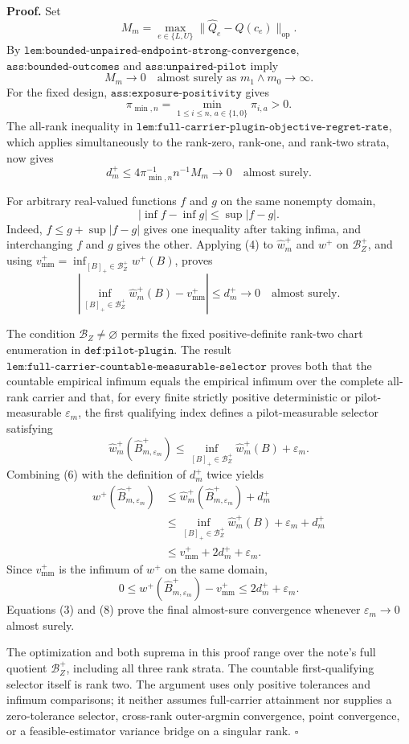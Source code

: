 \textbf{Proof.}
Set
\[
 M_m=\max_{e\in\{L,U\}}
 \lVert\widehat Q_e-Q(c_e)\rVert_{\mathrm{op}}.
\]
By \(\texttt{lem:bounded-unpaired-endpoint-strong-convergence}\), \(\texttt{ass:bounded-outcomes}\) and \(\texttt{ass:unpaired-pilot}\) imply
\[
 M_m\longrightarrow0
 \quad\text{almost surely as }m_1\wedge m_0\to\infty.
\tag{1}
\]
For the fixed design, \(\texttt{ass:exposure-positivity}\) gives
\[
 \pi_{\min,n}=\min_{1\le i\le n,\,a\in\{1,0\}}\pi_{i,a}>0.
\tag{2}
\]
The all-rank inequality in \(\texttt{lem:full-carrier-plugin-objective-regret-rate}\), which applies simultaneously to the rank-zero, rank-one, and rank-two strata, now gives
\[
 d_m^+
 \le4\pi_{\min,n}^{-1}n^{-1}M_m
 \longrightarrow0
 \quad\text{almost surely}.
\tag{3}
\]

For arbitrary real-valued functions \(f\) and \(g\) on the same nonempty domain,
\[
 \left|\inf f-\inf g\right|\le\sup|f-g|.
\tag{4}
\]
Indeed, \(f\le g+\sup|f-g|\) gives one inequality after taking infima, and interchanging \(f\) and \(g\) gives the other.  Applying (4) to \(\widehat w_m^+\) and \(w^+\) on \(\mathcal B_Z^+\), and using
\(
 v_{\mathrm{mm}}^+=\inf_{[B]_+\in\mathcal B_Z^+}w^+(B)
\), proves
\[
 \left|
 \inf_{[B]_+\in\mathcal B_Z^+}\widehat w_m^+(B)
 -v_{\mathrm{mm}}^+
 \right|
 \le d_m^+\longrightarrow0
 \quad\text{almost surely}.
\tag{5}
\]

The condition \(\mathcal B_Z\ne\varnothing\) permits the fixed positive-definite rank-two chart enumeration in \(\texttt{def:pilot-plugin}\).  The result \(\texttt{lem:full-carrier-countable-measurable-selector}\) proves both that the countable empirical infimum equals the empirical infimum over the complete all-rank carrier and that, for every finite strictly positive deterministic or pilot-measurable \(\varepsilon_m\), the first qualifying index defines a pilot-measurable selector satisfying
\[
 \widehat w_m^+(\widehat B_{m,\varepsilon_m}^+)
 \le
 \inf_{[B]_+\in\mathcal B_Z^+}\widehat w_m^+(B)+\varepsilon_m.
\tag{6}
\]
Combining (6) with the definition of \(d_m^+\) twice yields
\[
\begin{aligned}
w^+(\widehat B_{m,\varepsilon_m}^+)
&\le \widehat w_m^+(\widehat B_{m,\varepsilon_m}^+)+d_m^+\\
&\le \inf_{[B]_+\in\mathcal B_Z^+}\widehat w_m^+(B)
   +\varepsilon_m+d_m^+\\
&\le v_{\mathrm{mm}}^++2d_m^++\varepsilon_m.
\end{aligned}
\tag{7}
\]
Since \(v_{\mathrm{mm}}^+\) is the infimum of \(w^+\) on the same domain,
\[
 0\le
 w^+(\widehat B_{m,\varepsilon_m}^+)-v_{\mathrm{mm}}^+
 \le2d_m^++\varepsilon_m.
\tag{8}
\]
Equations (3) and (8) prove the final almost-sure convergence whenever \(\varepsilon_m\to0\) almost surely.

The optimization and both suprema in this proof range over the note's full quotient \(\mathcal B_Z^+\), including all three rank strata.  The countable first-qualifying selector itself is rank two.  The argument uses only positive tolerances and infimum comparisons; it neither assumes full-carrier attainment nor supplies a zero-tolerance selector, cross-rank outer-argmin convergence, point convergence, or a feasible-estimator variance bridge on a singular rank. \(\square\)